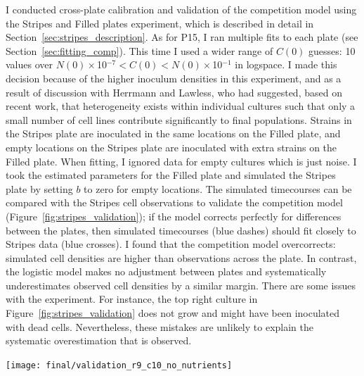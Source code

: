 \begin{multicols}{2}
I conducted cross-plate calibration and validation of the
competition model using the Stripes and Filled plates experiment,
which is described in detail in
Section~\ref{sec:stripes_description}.
%
As for P15, I ran multiple fits to each plate (see
Section~\ref{sec:fitting_comp}). This time I used a wider range of
\(C(0)\) guesses: 10 values over
\(N(0)\times\)10\(^{-7} < C(0) < N(0)\times\)10\(^{-1}\) in
logspace. I made this decision because of the higher inoculum
densities in this experiment, and as a result of discussion with
Herrmann and Lawless, who had suggested, based on recent work, that
heterogeneity exists within individual cultures such that only a small
number of cell lines contribute significantly to final
populations. Strains in the Stripes plate are inoculated in the same
locations on the Filled plate, and empty locations on the Stripes
plate are inoculated with extra strains on the Filled plate. When
fitting, I ignored data for empty cultures which is just noise. I took
the estimated parameters for the Filled plate and simulated the
Stripes plate by setting \(b\) to zero for empty locations. The
simulated timecourses can be compared with the Stripes cell
observations to validate the competition model
(Figure~\ref{fig:stripes_validation}); if the model corrects perfectly
for differences between the plates, then simulated timecourses (blue
dashes) should fit closely to Stripes data (blue crosses). I found
that the competition model overcorrects: simulated cell densities are
higher than observations across the plate. In contrast, the logistic
model makes no adjustment between plates and systematically
underestimates observed cell densities by a similar margin.
There are some issues with the experiment. For instance, the top right
culture in Figure~\ref{fig:stripes_validation} does not grow and might
have been inoculated with dead cells. Nevertheless, these mistakes are
unlikely to explain the systematic overestimation that is observed.

\end{multicols}
\graphicspath{{images/stripes/}}
\begin{Figure}
  \centering
  \texttt{[image: final/validation\_r9\_c10\_no\_nutrients]}
  \label{fig:stripes_validation}
\end{Figure}

